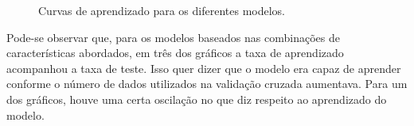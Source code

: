 \documentclass[conference]{IEEEtran}
\begin{document}
\begin{figure}[!h]
{{			
		}
	}
	\quad
	\caption{Curvas de aprendizado para os diferentes modelos.}
	\label{fig:learningcurves}
\end{figure}

Pode-se observar que, para os modelos baseados nas combinações de características abordados, em três dos gráficos a taxa de aprendizado acompanhou a taxa de teste. Isso quer dizer que o modelo era capaz de aprender conforme o número de dados utilizados na validação cruzada aumentava. Para um dos gráficos, houve uma certa oscilação no que diz respeito ao aprendizado do modelo.
\end{document}
